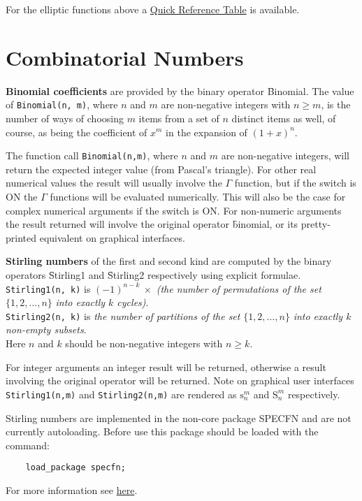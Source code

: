 For the elliptic functions above
a \hyperlink{ELLIPFNTAB}{Quick Reference Table} is available.

\section{Combinatorial Numbers}
  
\hypertarget{operator:BINOMIAL}{}
\textbf{Binomial coefficients} are provided by the binary operator \f{Binomial}.
The value of \texttt{Binomial(n, m)}, where $n$ and $m$ are non-negative
integers with $n \geq m$, is the number of ways of choosing $m$ items from a
set of $n$ distinct items as well, of course, as being the coefficient of $x^m$
in the expansion of $(1+x)^n$.

The function call \texttt{Binomial(n,m)}, where $n$ and $m$
are non-negative integers, will return the expected integer value
(from Pascal's triangle). For other real numerical values the result will
usually involve the $\Gamma$ function, but if the switch
 is ON the $\Gamma$ functions will be evaluated numerically.
This will also be the case for complex numerical arguments if the switch
 is ON.  For non-numeric arguments the result returned will
involve the original operator \f{binomial}, or its pretty-printed equivalent
on graphical interfaces.

\hypertarget{operator:Stirling1}{}\hypertarget{operator:Stirling2}{}
\textbf{Stirling numbers} of the first and second kind are computed
by the binary operators \f{Stirling1} and \f{Stirling2}
respectively using explicit formulae.
\texttt{Stirling1(n, k)} is $(-1)^{n-k}\ \times$
\emph{(the number of permutations of the set} $\{1, 2, \ldots, n\}$
\emph{into exactly $k$ cycles)}.\\
\texttt{Stirling2(n, k)} is \emph{the number of partitions of the set}
$\{1, 2, \ldots, n\}$ \emph{into exactly $k$ non-empty subsets}.\\
Here $n$ and $k$ should be non-negative integers with $n \geq k$.

For integer arguments an integer result will be
returned, otherwise a result involving the original operator will be returned.
Note on graphical user interfaces \texttt{Stirling1(n,m)} and
\texttt{Stirling2(n,m)} are rendered as
$\mathrm{s}_n^m$ and $\mathrm{S}_n^m$ respectively.

Stirling numbers are implemented in the non-core package SPECFN and are
not currently autoloading. Before use this package should be loaded with the
command:
\begin{verbatim}
    load_package specfn;
\end{verbatim}
For more information see \hyperlink{STIRL}{here}.

